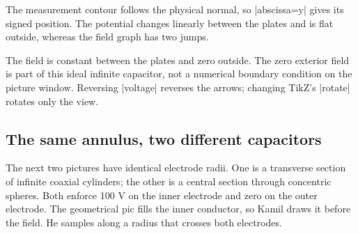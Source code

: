 The measurement contour follows the physical normal, so |abscissa=y| gives
its signed position. The potential changes linearly between the plates and
is flat outside, whereas the field graph has two jumps.

\begin{codeexample}[width=0pt]
\begin{tikzpicture}
\begin{axis}[width=7cm,height=4.5cm,no markers,grid=major,
  xlabel={$y$ (cm)},ylabel={$V$ (V)}]
  \femmelectricplot[profile=plate normal,component=V,abscissa=y,
    plot options={blue!70!black,thick}]
\end{axis}
\end{tikzpicture}
\begin{tikzpicture}
\begin{axis}[width=7cm,height=4.5cm,no markers,grid=major,
  xlabel={$y$ (cm)},ylabel={$E_y$ (V/m)}]
  \femmelectricplot[profile=plate normal,component=Ey,abscissa=y,
    plot options={red!70!black,thick}]
\end{axis}
\end{tikzpicture}
\end{codeexample}

The field is constant between the plates and zero outside. The zero exterior
field is part of this ideal infinite capacitor, not a numerical boundary
condition on the picture window. Reversing |voltage| reverses the arrows;
changing TikZ's |rotate| rotates only the view.

\subsection{The same annulus, two different capacitors}
The next two pictures have identical electrode radii. One is a transverse
section of infinite coaxial cylinders; the other is a central section through
concentric spheres. Both enforce 100 V on the inner electrode and zero on the
outer electrode. The geometrical pic fills the inner conductor, so Kamil draws
it before the field. He samples along a radius that crosses both electrodes.

\begin{codeexample}
\end{codeexample}

